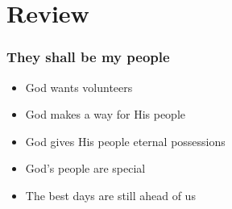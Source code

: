 \section{Review}

\begin{frame}
\frametitle{They shall be my people}
	\begin{itemize}
		\item God wants volunteers
		\item God makes a way for His people
		\item God gives His people eternal possessions
		\item God's people are special
		\item The best days are still ahead of us
	\end{itemize}

\end{frame}
